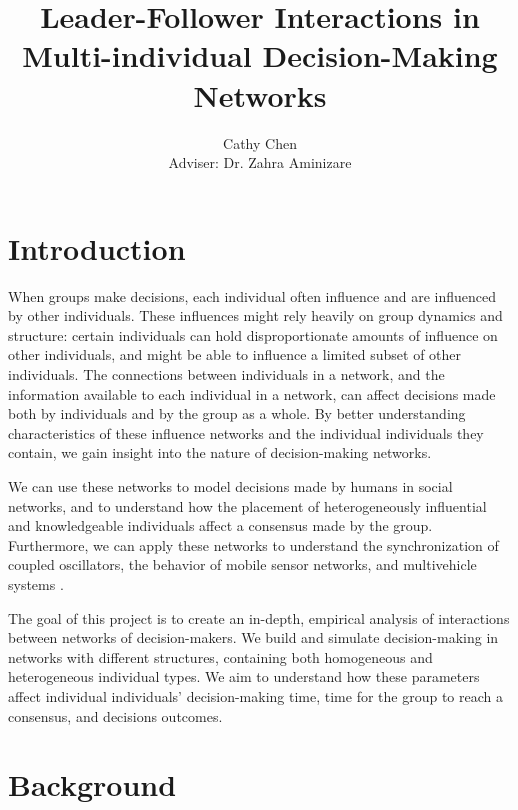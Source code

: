 \documentclass[pageno]{jpaper}
\begin{document}
\title{Leader-Follower Interactions in Multi-individual Decision-Making Networks}

\author{Cathy Chen\\Adviser: Dr. Zahra Aminizare}

\date{}
\maketitle
\begin{abstract}
\end{abstract}
\tableofcontents
\pagebreak

\thispagestyle{empty}

\section{Introduction}
When groups make decisions, each individual often influence and are influenced by other individuals. These influences might rely heavily on group dynamics and structure: certain individuals can hold disproportionate amounts of influence on other individuals, and might be able to influence a limited subset of other individuals. The connections between individuals in a network, and the information available to each individual in a network, can affect decisions made both by individuals and by the group as a whole. By better understanding characteristics of these influence networks and the individual individuals they contain, we gain insight into the nature of decision-making networks.

We can use these networks to model decisions made by humans in social networks, and to understand how the placement of heterogeneously influential and knowledgeable individuals affect a consensus made by the group. Furthermore, we can apply these networks to understand the synchronization of coupled oscillators, the behavior of mobile sensor networks, and multivehicle systems \cite{olfati-saber_consensus_2007}.

The goal of this project is to create an in-depth, empirical analysis of interactions between networks of decision-makers. We build and simulate decision-making in networks with different structures, containing both homogeneous and heterogeneous individual types. We aim to understand how these parameters affect individual individuals' decision-making time, time for the group to reach a consensus, and decisions outcomes.

\section{Background}
\end{document}

